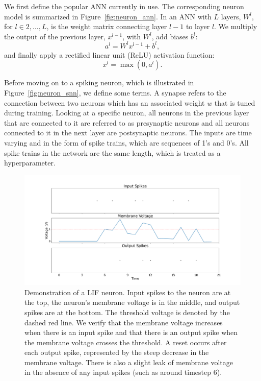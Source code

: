 \documentclass [MS] {UCLAthesis}
\begin{document}
We first define the popular ANN currently in use. The corresponding neuron model is summarized in Figure~\ref{fig:neuron_ann}. In an ANN with $L$ layers, $W^l$, for $l \in 2,\dots, L$, is the weight matrix connecting layer $l-1$ to layer $l$. We multiply the output of the previous layer, $x^{l-1}$, with $W^l$, add biases $b^l$:
\begin{equation}
    a^l =  W^l x^{l-1} + b^l,
\end{equation}
and finally apply a rectified linear unit (ReLU) activation function:
\begin{equation}
    x^l = \max(0, a^l).
\end{equation}

Before moving on to a spiking neuron, which is illustrated in Figure~\ref{fig:neuron_snn}, we define some terms. A synapse refers to the connection between two neurons which has an associated weight $w$ that is tuned during training. Looking at a specific neuron, all neurons in the previous layer that are connected to it are referred to as presynaptic neurons and all neurons connected to it in the next layer are postsynaptic neurons. The inputs are time varying and in the form of spike trains, which are sequences of 1's and 0's. All spike trains in the network are the same length, which is treated as a hyperparameter.

\begin{figure}
    \centering
    \includegraphics[width=\textwidth]{snn_spike_example}
    \caption[Demonstration of a Leaky Integrate-and-Fire (LIF) neuron]{Demonstration of a LIF neuron. Input spikes to the neuron are at the top, the neuron's membrane voltage is in the middle, and output spikes are at the bottom. The threshold voltage is denoted by the dashed red line. We verify that the membrane voltage increases when there is an input spike and that there is an output spike when the membrane voltage crosses the threshold. A reset occurs after each output spike, represented by the steep decrease in the membrane voltage. There is also a slight leak of membrane voltage in the absence of any input spikes (such as around timestep 6).}
    \label{fig:lif_spike_example}
\end{figure}
\end{document}
